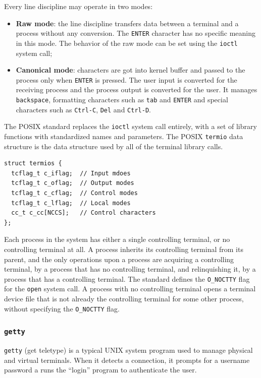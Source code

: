 Every line discipline may operate in two modes:
\begin{itemize}
\item \textbf{Raw mode}: the line discipline transfers data between a terminal and a process without any conversion. The \texttt{ENTER} character has no specific meaning in this mode. The behavior of the raw mode can be set using the \texttt{ioctl} system call;
\item \textbf{Canonical mode}: characters are got into kernel buffer and passed to the process only when \texttt{ENTER} is pressed. The user input is converted for the receiving process and the process output is converted for the user. It manages \texttt{backspace}, formatting characters such as \texttt{tab} and \texttt{ENTER} and special characters such as \texttt{Ctrl-C}, \texttt{Del} and \texttt{Ctrl-D}.
\end{itemize}

The POSIX standard replaces the \texttt{ioctl} system call entirely, with a set of library functions with standardized names and parameters. The POSIX \texttt{termio} data structure is the data structure used by all of the terminal library calls.
\begin{verbatim}
struct termios {
  tcflag_t c_iflag;  // Input mdoes
  tcflag_t c_oflag;  // Output modes
  tcflag_t c_cflag;  // Control modes
  tcflag_t c_lflag;  // Local modes
  cc_t c_cc[NCCS];   // Control characters
};
\end{verbatim}
Each process in the system has either a single controlling terminal, or no controlling terminal at all. A process inherits its controlling terminal from its parent, and the only operations upon a process are acquiring a controlling terminal, by a process that has no controlling terminal, and relinquishing it, by a process that has a controlling terminal. The standard defines the \texttt{O\_NOCTTY} flag for the \texttt{open} system call. A process with no controlling terminal opens a terminal device file that is not already the controlling terminal for some other process, without specifying the \texttt{O\_NOCTTY} flag.

\subsubsection{\texttt{getty}}
\texttt{getty} (get teletype) is a typical UNIX system program used to manage physical and virtual terminals. When it detects a connection, it prompts for a username password a runs the ``login'' program to authenticate the user.

